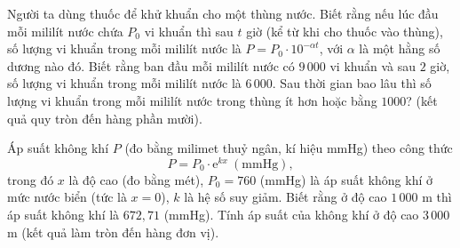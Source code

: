 \begin{bt}%
Người ta dùng thuốc để khử khuẩn cho một thùng nước. Biết rằng nếu lúc đầu mỗi mililít nước chứa $P_0$ vi khuẩn thì sau $ t$ giờ (kể từ khi cho thuốc vào thùng), số lượng vi khuẩn trong mỗi mililít nước là $ P=P_0\cdot{10^{-\alpha t}}$, với $\alpha $ là một hằng số dương nào đó. Biết rằng ban đầu mỗi mililít nước có $9\,000$ vi khuẩn và sau $2$ giờ, số lượng vi khuẩn trong mỗi mililít nước là $6\,000$. Sau thời gian bao lâu thì số lượng vi khuẩn trong mỗi mililít nước trong thùng ít hơn hoặc bằng $1000$? (kết quả quy tròn đến hàng phần mười).
\end{bt}

\begin{bt}%
Áp suất không khí $P$ (đo bằng milimet thuỷ ngân, kí hiệu mmHg) theo công thức
\[P=P_0\cdot \mathrm{e}^{kx}\ (\text{mmHg}),
\]
trong đó $x$ là độ cao (đo bằng mét), $P_0=760$ (mmHg) là áp suất không khí ở mức nước biển (tức là $x=0$), $k$ là hệ số suy giảm. Biết rằng ở độ cao $1\,000$ m thì áp suất không khí là $672{,}71$ (mmHg). Tính áp suất của không khí ở độ cao $3\,000$ m (kết quả làm tròn đến hàng đơn vị).
\end{bt}


